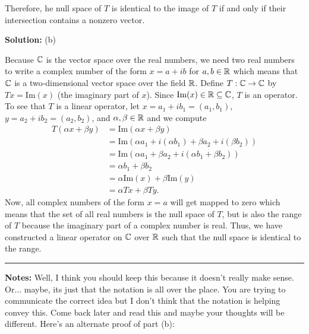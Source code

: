 \documentclass{article}
\begin{document}
	Therefore, he null space of $T$ is identical to the image of $T$ if and only if their intersection contains a nonzero vector. 
	
\textbf{Solution:} (b) 

	Because $\mathbb C$ is the vector space over the real numbers, we need two real numbers to write a complex number of the form $x = a+ib$ for $a,b\in\mathbb R$ which
	means that $\mathbb C$ is a two-dimensional vector space over the field $\mathbb R$. Define $T: \mathbb C \to \mathbb C$ by $Tx = \text{Im}(x)$ (the imaginary part of $x$). Since
	 $\text{Im}(x)\in\mathbb R\subseteq \mathbb C$, $T$ is an operator. To see that $T$ is a linear operator, let $x = a_1 + ib_1 = (a_1, b_1)$, $y = a_2 + ib_2 = (a_2, b_2)$, and
	  $\alpha, \beta\in\mathbb R$ and we compute 
	  	\begin{align*}
			T(\alpha x+ \beta y) & = \text{Im}(\alpha x+ \beta y)\\
						       & = \text{Im}(\alpha a_1 + i(\alpha b_1) + \beta a_2 + i (\beta b_2))\\
						       & = \text{Im}(\alpha a_1 + \beta a_2 + i(\alpha b_1 + \beta b_2))\\
						       & = \alpha b_1 + \beta b_2\\
						       & = \alpha \text{Im}(x) + \beta  \text{Im}(y)\\
						       & = \alpha Tx + \beta Ty.
		\end{align*}
	Now, all complex numbers of the form $x = a$ will get mapped to zero which means that the set of all real numbers is the null space of $T$, but is also the
	range of $T$ because the imaginary part of a complex number is real. Thus, we have constructed a linear operator on $\mathbb C$ over $\mathbb R$ such that the null space
	is identical to the range.\\
	
\hrule

\textbf{Notes:} Well, I think you should keep this because it doesn't really make sense. Or... maybe, its just that the notation is all over the place. You are trying to communicate the correct idea but I don't think that the notation is helping convey this. Come back later and read this and maybe your thoughts will be different. Here's an alternate proof of part (b):\\
\end{document}
